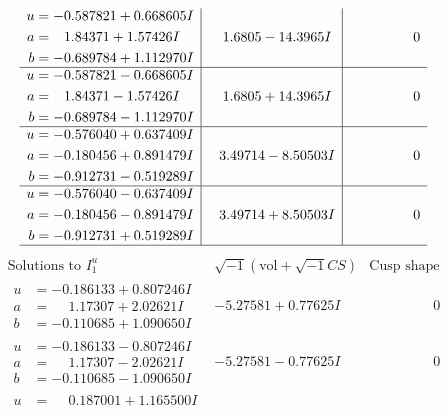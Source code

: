 \documentclass[1p]{elsarticle_modified}
\theoremstyle{definition}
\newcommand{\I}{\sqrt{-1}}
\begin{document}
$$\begin{array}{c|c|c}
\begin{aligned}
u &= -0.587821 + 0.668605 I \\
a &= \phantom{-}1.84371 + 1.57426 I \\
b &= -0.689784 + 1.112970 I\end{aligned}
 & \phantom{-}1.6805 - 14.3965 I & \phantom{-0.000000 } 0 \\ \hline\begin{aligned}
u &= -0.587821 - 0.668605 I \\
a &= \phantom{-}1.84371 - 1.57426 I \\
b &= -0.689784 - 1.112970 I\end{aligned}
 & \phantom{-}1.6805 + 14.3965 I & \phantom{-0.000000 } 0 \\ \hline\begin{aligned}
u &= -0.576040 + 0.637409 I \\
a &= -0.180456 + 0.891479 I \\
b &= -0.912731 - 0.519289 I\end{aligned}
 & \phantom{-}3.49714 - 8.50503 I & \phantom{-0.000000 } 0 \\ \hline\begin{aligned}
u &= -0.576040 - 0.637409 I \\
a &= -0.180456 - 0.891479 I \\
b &= -0.912731 + 0.519289 I\end{aligned}
 & \phantom{-}3.49714 + 8.50503 I & \phantom{-0.000000 } 0\\
 \hline 
 \end{array}$$\newpage$$\begin{array}{c|c|c}  
\text{Solutions to }I^u_{1}& \I (\text{vol} + \sqrt{-1}CS) & \text{Cusp shape}\\
 \hline 
\begin{aligned}
u &= -0.186133 + 0.807246 I \\
a &= \phantom{-}1.17307 + 2.02621 I \\
b &= -0.110685 + 1.090650 I\end{aligned}
 & -5.27581 + 0.77625 I & \phantom{-0.000000 } 0 \\ \hline\begin{aligned}
u &= -0.186133 - 0.807246 I \\
a &= \phantom{-}1.17307 - 2.02621 I \\
b &= -0.110685 - 1.090650 I\end{aligned}
 & -5.27581 - 0.77625 I & \phantom{-0.000000 } 0 \\ \hline\begin{aligned}
u &= \phantom{-}0.187001 + 1.165500 I \\

\end{aligned}
\end{array}$$
\end{document}
